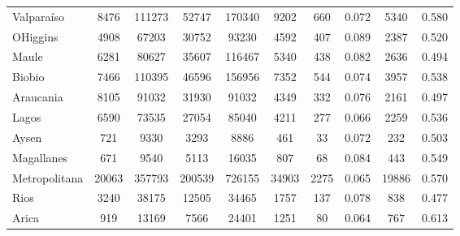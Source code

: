 \documentclass[12pt]{article}
\begin{document}
\begin{table}[htp!]
\begin{tabular}[t]{lccccccccc}
        Valparaíso            & 8476                         & 111273                       & 52747                     & 170340                         & 9202                      & 660  & 0.072 & 5340  & 0.580 \\
        OHiggins              & 4908                         & 67203                        & 30752                     & 93230                          & 4592                      & 407  & 0.089 & 2387  & 0.520 \\
        Maule                 & 6281                         & 80627                        & 35607                     & 116467                         & 5340                      & 438  & 0.082 & 2636  & 0.494 \\
        Biobio                & 7466                         & 110395                       & 46596                     & 156956                         & 7352                      & 544  & 0.074 & 3957  & 0.538 \\
        Araucania             & 8105                         & 91032                        & 31930                     & 91032                          & 4349                      & 332  & 0.076 & 2161  & 0.497 \\
        Lagos                 & 6590                         & 73535                        & 27054                     & 85040                          & 4211                      & 277  & 0.066 & 2259  & 0.536 \\
        Aysen                 & 721                          & 9330                         & 3293                      & 8886                           & 461                       & 33   & 0.072 & 232   & 0.503 \\
        Magallanes            & 671                          & 9540                         & 5113                      & 16035                          & 807                       & 68   & 0.084 & 443   & 0.549 \\
        Metropolitana         & 20063                        & 357793                       & 200539                    & 726155                         & 34903                     & 2275 & 0.065 & 19886 & 0.570 \\
        Rios                  & 3240                         & 38175                        & 12505                     & 34465                          & 1757                      & 137  & 0.078 & 838   & 0.477 \\
        Arica                 & 919                          & 13169                        & 7566                      & 24401                          & 1251                      & 80   & 0.064 & 767   & 0.613 \\

\end{tabular}
\end{table}
\end{document}
